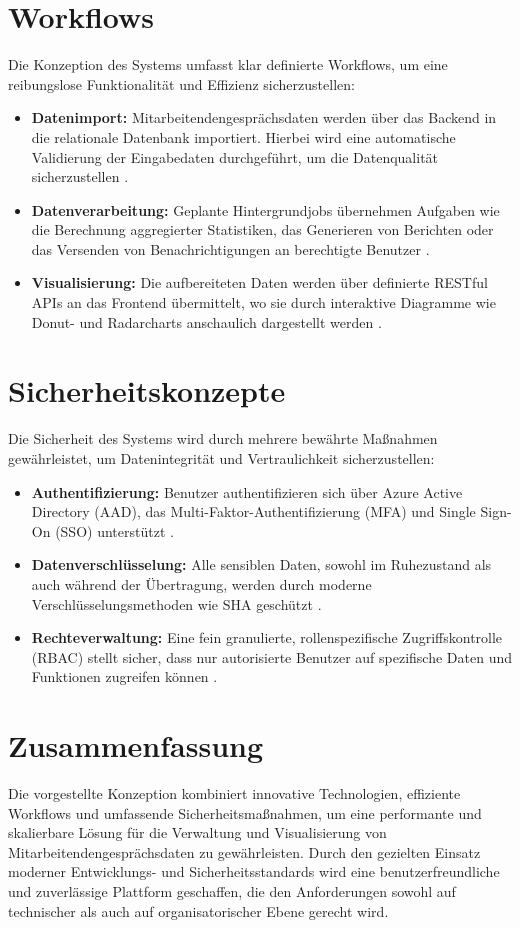 \section{Workflows}
Die Konzeption des Systems umfasst klar definierte Workflows, um eine reibungslose Funktionalität und Effizienz sicherzustellen:
\begin{itemize}
    \item \textbf{Datenimport:} Mitarbeitendengesprächsdaten werden über das Backend in die relationale Datenbank importiert. Hierbei wird eine automatische Validierung der Eingabedaten durchgeführt, um die Datenqualität sicherzustellen \cite{gupta2020data, prat2021pipeline}.
    \item \textbf{Datenverarbeitung:} Geplante Hintergrundjobs übernehmen Aufgaben wie die Berechnung aggregierter Statistiken, das Generieren von Berichten oder das Versenden von Benachrichtigungen an berechtigte Benutzer \cite{hollingsworth2020workflow, apache2023workflow}.
    \item \textbf{Visualisierung:} Die aufbereiteten Daten werden über definierte RESTful APIs an das Frontend übermittelt, wo sie durch interaktive Diagramme wie Donut- und Radarcharts anschaulich dargestellt werden \cite{kirk2016data, evergreen2016effective}.
\end{itemize}


\section{Sicherheitskonzepte}
Die Sicherheit des Systems wird durch mehrere bewährte Maßnahmen gewährleistet, um Datenintegrität und Vertraulichkeit sicherzustellen:
\begin{itemize}
    \item \textbf{Authentifizierung:} Benutzer authentifizieren sich über Azure Active Directory (AAD), das Multi-Faktor-Authentifizierung (MFA) und Single Sign-On (SSO) unterstützt \cite{microsoftAAD}.
    \item \textbf{Datenverschlüsselung:} Alle sensiblen Daten, sowohl im Ruhezustand als auch während der Übertragung, werden durch moderne Verschlüsselungsmethoden wie SHA geschützt \cite{schneier2015applied}.
    \item \textbf{Rechteverwaltung:} Eine fein granulierte, rollenspezifische Zugriffskontrolle (RBAC) stellt sicher, dass nur autorisierte Benutzer auf spezifische Daten und Funktionen zugreifen können \cite{ferraiolo2003rbac}.
\end{itemize}


\section{Zusammenfassung}
Die vorgestellte Konzeption kombiniert innovative Technologien, effiziente Workflows und umfassende Sicherheitsmaßnahmen, um eine performante und skalierbare Lösung für die Verwaltung und Visualisierung von Mitarbeitendengesprächsdaten zu gewährleisten. Durch den gezielten Einsatz moderner Entwicklungs- und Sicherheitsstandards wird eine benutzerfreundliche und zuverlässige Plattform geschaffen, die den Anforderungen sowohl auf technischer als auch auf organisatorischer Ebene gerecht wird.

